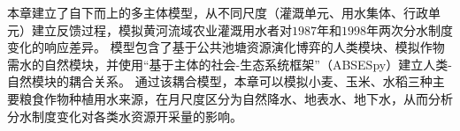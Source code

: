 
本章建立了自下而上的多主体模型，从不同尺度（灌溉单元、用水集体、行政单元）建立反馈过程，模拟黄河流域农业灌溉用水者对$1987$年和$1998$年两次分水制度变化的响应差异。
模型包含了基于公共池塘资源演化博弈的人类模块、模拟作物需水的自然模块，并使用“基于主体的社会-生态系统框架”（ABSESpy）建立人类-自然模块的耦合关系。
通过该耦合模型，本章可以模拟小麦、玉米、水稻三种主要粮食作物种植用水来源，在月尺度区分为自然降水、地表水、地下水，从而分析分水制度变化对各类水资源开采量的影响。
